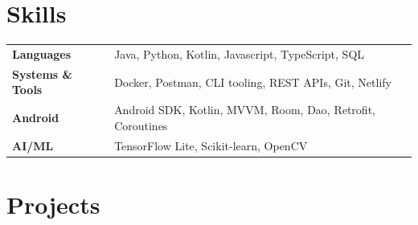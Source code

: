 \documentclass[a4paper,11pt]{article}
\makeatletter
\newenvironment{jobshort}[2]
    {
    \begin{tabularx}{\linewidth}{@{}l X r@{}}
    \textbf{#1} & \hfill &  #2 \\[3.75pt]
    \end{tabularx}
    }
    {
    }
\newenvironment{joblong}[2]
    {
    \begin{tabularx}{\linewidth}{@{}l X r@{}}
    \textbf{#1} & \hfill &  #2 \\[3.75pt]
    \end{tabularx}
    \begin{minipage}[t]{\linewidth}
    \begin{itemize}[nosep,after=\strut, leftmargin=1em, itemsep=3pt,label=--]
    }
    {
    \end{itemize}
    \end{minipage}    
    }
\makeatother
\begin{document}
\section{Skills}
\begin{tabularx}{\linewidth}{@{}l X@{}}
	\textbf{Languages}        & \normalsize{Java, Python, Kotlin, Javascript, TypeScript, SQL} \\
	\textbf{Systems \& Tools} & \normalsize{Docker, Postman, CLI tooling, REST APIs, Git, Netlify} \\
	\textbf{Android}          & \normalsize{Android SDK, Kotlin, MVVM, Room, Dao, Retrofit, Coroutines} \\
	\textbf{AI/ML}            & \normalsize{TensorFlow Lite, Scikit-learn, OpenCV} \\
\end{tabularx}





\section{Projects}
\end{document}
